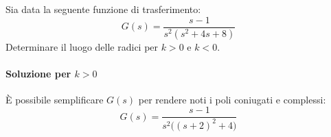 \begin{esercizio}
Sia data la seguente funzione di trasferimento:
\[
	G(s) = \frac{s-1}{s^2(s^2+4s+8)}
\]
Determinare il luogo delle radici per \(k>0\) e \(k<0\).

\paragraph{Soluzione per \(k>0\)}
È possibile semplificare \(G(s)\) per rendere noti i poli coniugati e complessi:
\[
	G(s) = \frac{s-1}{s^2\bigl( (s+2)^2 +4 \bigr)}
\]

\begin{figure}[ht]
	\centering
\end{figure}


\end{esercizio}

